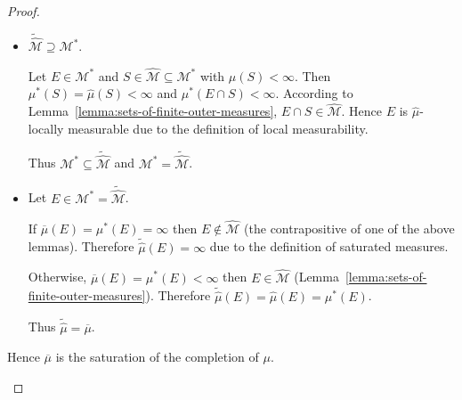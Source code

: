 \begin{proof}
\begin{enumerate}[itemsep=0pt,label=\textbf{\alph*.}]
\begin{itemize}
                        Hence \( \mu^{\ast}(B) = \mu^{\ast}(B \cap E) + \mu^{\ast}(B \setminus E) \) for every \( B \subseteq X \), which implies \( E \in \mathcal{M}^{\ast} \). Thus \( \widetilde{\widehat{\mathcal{M}}} \subseteq \mathcal{M}^{\ast} \).
                  \item \( \widetilde{\widehat{\mathcal{M}}} \supseteq \mathcal{M}^{\ast} \).

                        Let \( E \in \mathcal{M}^{\ast} \) and \( S \in \widehat{\mathcal{M}} \subseteq \mathcal{M}^{\ast} \) with \( \widehat{\mu}(S) < \infty \). Then \( \mu^{\ast}(S) = \widehat{\mu}(S) < \infty \) and \( \mu^{\ast}(E \cap S) < \infty \). According to Lemma~\ref{lemma:sets-of-finite-outer-measures}, \( E \cap S \in \widehat{\mathcal{M}} \). Hence \( E \) is \( \widehat{\mu} \)-locally measurable due to the definition of local measurability.

                        Thus \( \mathcal{M}^{\ast} \subseteq \widetilde{\widehat{\mathcal{M}}} \) and \( \mathcal{M}^{\ast} = \widetilde{\widehat{\mathcal{M}}} \).
                  \item Let \( E \in \mathcal{M}^{\ast} = \widetilde{\widehat{\mathcal{M}}} \).

                        If \( \overline{\mu}(E) = \mu^{\ast}(E) = \infty \) then \( E \notin \widehat{\mathcal{M}} \) (the contrapositive of one of the above lemmas). Therefore \( \widetilde{\widehat{\mu}}(E) = \infty \) due to the definition of saturated measures.

                        Otherwise, \( \overline{\mu}(E) = \mu^{\ast}(E) < \infty \) then \( E \in \widehat{\mathcal{M}} \) (Lemma~\ref{lemma:sets-of-finite-outer-measures}). Therefore \( \widetilde{\widehat{\mu}}(E) = \widehat{\mu}(E) = \mu^{\ast}(E) \).

                        Thus \( \widetilde{\widehat{\mu}} = \overline{\mu} \).
              \end{itemize}

              Hence \( \overline{\mu} \) is the saturation of the completion of \( \mu \).
    \end{enumerate}
\end{proof}

\newpage

